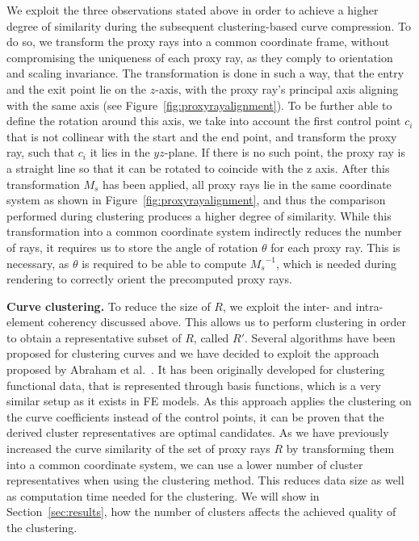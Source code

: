 \documentclass[journal]{vgtc}                %
\begin{document}
We exploit the three observations stated above in order to achieve a higher degree of similarity during the subsequent clustering-based curve compression. To do so, we transform the proxy rays into a common coordinate frame, without compromising the uniqueness of each proxy ray, as they comply to orientation and scaling invariance. The transformation is done in such a way, that the entry and the exit point lie on the $z$-axis, with the proxy ray's principal axis aligning with the same axis (see Figure~\ref{fig:proxyrayalignment}). To be further able to define the rotation around this axis, we take into account the first control point $c_i$ that is not collinear with the start and the end point, and transform the proxy ray, such that $c_i$ it lies in the $yz$-plane. If there is no such point, the proxy ray is a straight line so that it can be rotated to coincide with the z axis. After this transformation $M_s$ has been applied, all proxy rays lie in the same coordinate system as shown in Figure~\ref{fig:proxyrayalignment}, and thus the comparison performed during clustering produces a higher degree of similarity. While this transformation into a common coordinate system indirectly reduces the number of rays, it requires us to store the angle of rotation $\theta$ for each proxy ray. This is necessary, as $\theta$ is required to be able to compute ${M_s}^{-1}$, which is needed during rendering to correctly orient the precomputed proxy rays.

\noindent \textbf{Curve clustering.} To reduce the size of $R$, we exploit the inter- and intra-element coherency discussed above. This allows us to perform clustering in order to obtain a representative subset of $R$, called $R'$. Several algorithms have been proposed for clustering curves and we have decided to exploit the approach proposed by Abraham et al.~\cite{abraham03clustering}. It has been originally developed for clustering functional data, that is represented through basis functions, which is a very similar setup as it exists in FE models. As this approach applies the clustering on the curve coefficients instead of the control points, it can be proven that the derived cluster representatives are optimal candidates. As we have previously increased the curve similarity of the set of proxy rays $R$ by transforming them into a common coordinate system, we can use a lower number of cluster representatives when using the clustering method. This reduces data size as well as computation time needed for the clustering. We will show in Section~\ref{sec:results}, how the number of clusters affects the achieved quality of the clustering.
\end{document}
